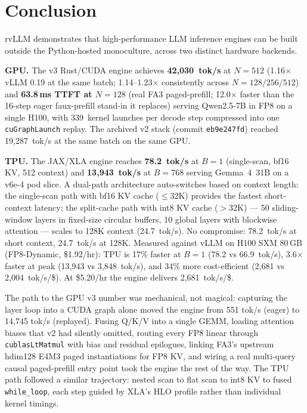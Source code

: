 \section{Conclusion}
\label{sec:conclusion}

rvLLM demonstrates that high-performance LLM inference engines can be
built outside the Python-hosted monoculture, across two distinct hardware
backends.

\textbf{GPU.} The v3 Rust/CUDA engine achieves
\textbf{42{,}030~tok/s} at $N\!=\!512$ (1.16$\times$ vLLM 0.19 at the
same batch; 1.14--1.23$\times$ consistently across
$N\!=\!128/256/512$) and \textbf{63.8\,ms TTFT at $N\!=\!128$} (real
FA3 paged-prefill; 12.0$\times$ faster than the 16-step eager
faux-prefill stand-in it replaces) serving Qwen2.5-7B in FP8 on a
single H100, with 339~kernel launches per decode step compressed into
one \texttt{cuGraphLaunch} replay. The archived v2 stack (commit
\texttt{eb9e247fd}) reached 19{,}287~tok/s at the same batch on the
same GPU.

\textbf{TPU.} The JAX/XLA engine reaches \textbf{78.2~tok/s} at
$B\!=\!1$ (single-scan, bf16 KV, 512 context) and \textbf{13{,}943~tok/s} at
$B\!=\!768$ serving Gemma~4~31B on a v6e-4 pod slice. A dual-path
architecture auto-switches based on context length: the single-scan path
with bf16 KV cache ($\le$32K) provides the fastest short-context latency;
the split-cache path with int8 KV cache ($>$32K) --- 50 sliding-window
layers in fixed-size circular buffers, 10 global layers with blockwise
attention --- scales to 128K context (24.7~tok/s). No compromise:
78.2~tok/s at short context, 24.7~tok/s at 128K. Measured against vLLM on
H100 SXM 80\,GB (FP8-Dynamic, \$1.92/hr): TPU is 17\% faster at
$B{=}1$ (78.2 vs 66.9~tok/s), 3.6$\times$ faster at peak (13{,}943 vs
3{,}848~tok/s), and 34\% more cost-efficient (2{,}681 vs
2{,}004~tok/s/\$). At \$5.20/hr the engine delivers
2{,}681~tok/s/\$.

The path to the GPU v3 number was mechanical, not magical: capturing the
layer loop into a CUDA graph alone moved the engine from 551 tok/s
(eager) to 14{,}745 tok/s (replayed). Fusing Q/K/V into a single GEMM,
loading attention biases that v2 had silently omitted, routing every FP8
linear through \texttt{cublasLtMatmul} with bias and residual epilogues,
linking FA3's upstream hdim128 E4M3 paged instantiations for FP8 KV,
and wiring a real multi-query causal paged-prefill entry point took
the engine the rest of the way. The TPU path followed a similar
trajectory: nested scan to flat scan to int8 KV to fused
\texttt{while\_loop}, each step guided by XLA's HLO profile rather
than individual kernel timings.

